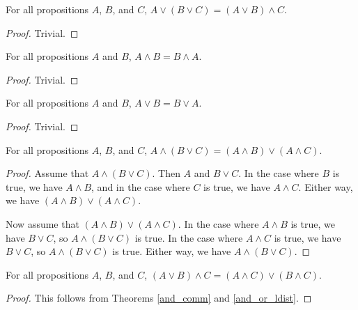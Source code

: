 \documentclass[../../math.tex]{subfiles}
\begin{document}
\begin{theorem} \label{or_assoc}
    For all propositions $A$, $B$, and $C$, $A \vee (B \vee C) = (A \vee B)
    \wedge C$.
\end{theorem}
\begin{proof}
    Trivial.
\end{proof}

\begin{theorem} \label{and_comm}
    For all propositions $A$ and $B$, $A \wedge B = B \wedge A$.
\end{theorem}
\begin{proof}
    Trivial.
\end{proof}

\begin{theorem} \label{or_comm}
    For all propositions $A$ and $B$, $A \vee B = B \vee A$.
\end{theorem}
\begin{proof}
    Trivial.
\end{proof}

\begin{theorem} \label{and_or_ldist}
    For all propositions $A$, $B$, and $C$, $A \wedge (B \vee C) = (A \wedge B)
    \vee (A \wedge C)$.
\end{theorem}
\begin{proof}
    Assume that $A \wedge (B \vee C)$.  Then $A$ and $B \vee C$.  In the case
    where $B$ is true, we have $A \wedge B$, and in the case where $C$ is true,
    we have $A \wedge C$.  Either way, we have $(A \wedge B) \vee (A \wedge C)$.

    Now assume that $(A \wedge B) \vee (A \wedge C)$.  In the case where $A
    \wedge B$ is true, we have $B \vee C$, so $A \wedge (B \vee C)$ is true.  In
    the case where $A \wedge C$ is true, we have $B \vee C$, so $A \wedge (B
    \vee C)$ is true.  Either way, we have $A \wedge (B \vee C)$.
\end{proof}

\begin{theorem} \label{and_or_rdist}
    For all propositions $A$, $B$, and $C$, $(A \vee B) \wedge C = (A \wedge C)
    \vee (B \wedge C)$.
\end{theorem}
\begin{proof}
    This follows from Theorems \ref{and_comm} and \ref{and_or_ldist}.
\end{proof}
\end{document}
